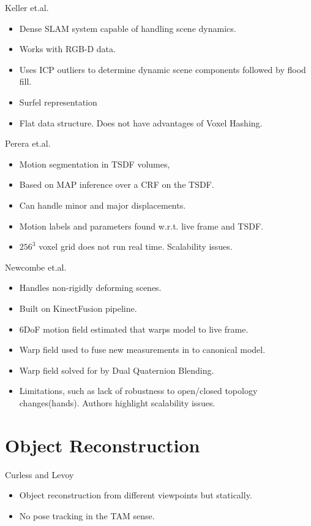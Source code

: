 Keller et.al. \cite{Keller2013}
\begin{itemize}
	\item Dense SLAM system capable of handling scene dynamics.
	\item Works with RGB-D data.
	\item Uses ICP outliers to determine dynamic scene components followed by flood fill.
	\item Surfel representation \cite{Pfister2000}
	\item Flat data structure. Does not have advantages of Voxel Hashing.
\end{itemize}

Perera et.al. \cite{Perera2015}
\begin{itemize}
	\item Motion segmentation in TSDF volumes,
	\item Based on MAP inference over a CRF on the TSDF.
	\item Can handle minor and major displacements.
	\item Motion labels and parameters found w.r.t. live frame and TSDF.
	\item $256^{3}$ voxel grid does not run real time. Scalability issues.
\end{itemize}

Newcombe et.al. \cite{Newcombe2015}
\begin{itemize}
	\item Handles non-rigidly deforming scenes.
	\item Built on KinectFusion pipeline.
	\item 6DoF motion field estimated that warps model to live frame.
	\item Warp field used to fuse new measurements in to canonical model.
	\item Warp field solved for by Dual Quaternion Blending. \cite{Kavan2006}
	\item Limitations, such as lack of robustness to open/closed topology changes(hands). Authors highlight scalability issues.
\end{itemize}

\section{Object Reconstruction}
\label{sec:lit_review_obj_recon}
Curless and Levoy \cite{Curless1996}
\begin{itemize}
	\item Object reconstruction from different viewpoints but statically.
	\item No pose tracking in the TAM sense.
\end{itemize}

